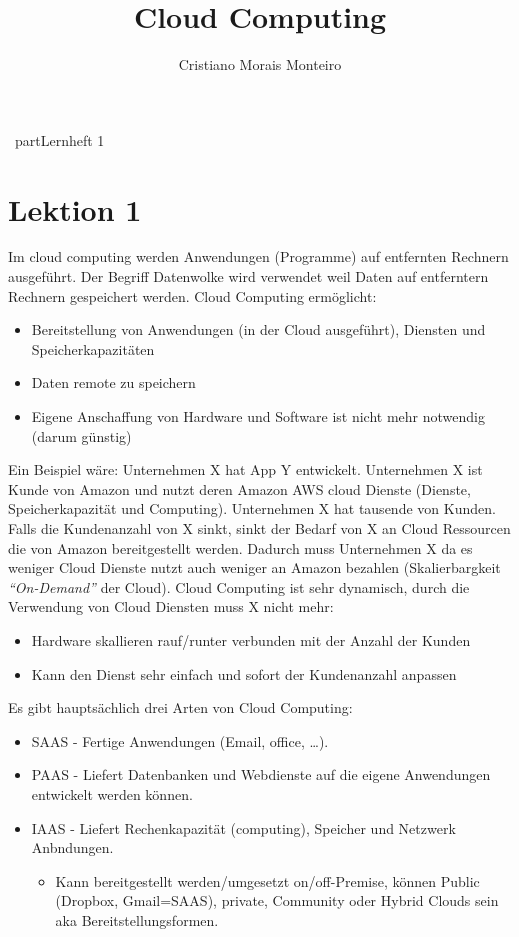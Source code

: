 \documentclass[a4paper,10pt]{article}
\author{Cristiano Morais Monteiro}
\title{Cloud Computing}
\begin{document}
\maketitle
\newpage
\justify
\tableofcontents
\newpage
\ part{Lernheft 1}
\section{Lektion 1}
Im cloud computing werden Anwendungen (Programme) auf entfernten Rechnern ausgeführt. Der Begriff Datenwolke wird verwendet weil Daten auf entferntern Rechnern gespeichert werden. \newline
Cloud Computing ermöglicht:
\begin{itemize}
	\item Bereitstellung von Anwendungen (in der Cloud ausgeführt), Diensten und Speicherkapazitäten
	\item Daten remote zu speichern
	\item Eigene Anschaffung von Hardware und Software ist nicht mehr notwendig (darum günstig)
\end{itemize}
Ein Beispiel wäre: \newline
Unternehmen X hat App Y entwickelt. Unternehmen X ist Kunde von Amazon und nutzt deren Amazon AWS cloud Dienste (Dienste, Speicherkapazität und Computing). Unternehmen X hat tausende von Kunden. Falls die Kundenanzahl von X sinkt, sinkt der Bedarf von X an Cloud Ressourcen die von Amazon bereitgestellt werden. Dadurch muss Unternehmen X da es weniger Cloud Dienste nutzt auch weniger an Amazon bezahlen (Skalierbargkeit \textit{``On-Demand''} der Cloud).
Cloud Computing ist sehr dynamisch, durch die Verwendung von Cloud Diensten muss X nicht mehr:
\begin{itemize}
	\item Hardware skallieren rauf/runter verbunden mit der Anzahl der Kunden
	\item Kann den Dienst sehr einfach und sofort der Kundenanzahl anpassen
\end{itemize}
\vspace{3mm}
Es gibt hauptsächlich drei Arten von Cloud Computing:
\begin{itemize}
	\item SAAS - Fertige Anwendungen (Email, office, \ldots).
	\item PAAS - Liefert Datenbanken und Webdienste auf die eigene Anwendungen entwickelt werden können.
	\item IAAS - Liefert Rechenkapazität (computing), Speicher und Netzwerk Anbndungen.
		\begin{itemize}
			\item Kann bereitgestellt werden/umgesetzt on/off-Premise, können Public (Dropbox, Gmail=SAAS), private, Community oder Hybrid Clouds sein aka Bereitstellungsformen.
		\end{itemize}
\end{itemize}
\end{document}
